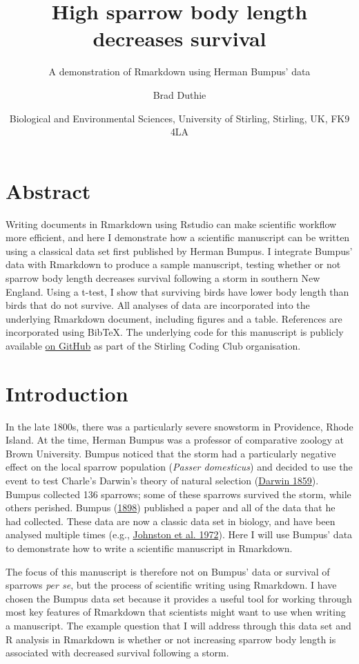 \documentclass[
]{article}
\title{High sparrow body length decreases survival}
\subtitle{A demonstration of Rmarkdown using Herman Bumpus' data}
\author{Brad Duthie}
\date{Biological and Environmental Sciences, University of Stirling,
Stirling, UK, FK9 4LA}
\begin{document}
\maketitle

\hypertarget{abstract}{%
\section{Abstract}\label{abstract}}

Writing documents in Rmarkdown using Rstudio can make scientific
workflow more efficient, and here I demonstrate how a scientific
manuscript can be written using a classical data set first published by
Herman Bumpus. I integrate Bumpus' data with Rmarkdown to produce a
sample manuscript, testing whether or not sparrow body length decreases
survival following a storm in southern New England. Using a t-test, I
show that surviving birds have lower body length than birds that do not
survive. All analyses of data are incorporated into the underlying
Rmarkdown document, including figures and a table. References are
incorporated using BibTeX. The underlying code for this manuscript is
publicly available
\href{https://github.com/StirlingCodingClub/Manuscripts_in_Rmarkdown}{on
GitHub} as part of the Stirling Coding Club organisation.

\hypertarget{introduction}{%
\section{Introduction}\label{introduction}}

In the late 1800s, there was a particularly severe snowstorm in
Providence, Rhode Island. At the time, Herman Bumpus was a professor of
comparative zoology at Brown University. Bumpus noticed that the storm
had a particularly negative effect on the local sparrow population
(\emph{Passer domesticus}) and decided to use the event to test Charle's
Darwin's theory of natural selection
(\protect\hyperlink{ref-Darwin1859}{Darwin 1859}). Bumpus collected 136
sparrows; some of these sparrows survived the storm, while others
perished. Bumpus (\protect\hyperlink{ref-Bumpus1898}{1898}) published a
paper and all of the data that he had collected. These data are now a
classic data set in biology, and have been analysed multiple times
(e.g., \protect\hyperlink{ref-Johnston1972}{Johnston et al. 1972}). Here
I will use Bumpus' data to demonstrate how to write a scientific
manuscript in Rmarkdown.

The focus of this manuscript is therefore not on Bumpus' data or
survival of sparrows \emph{per se}, but the process of scientific
writing using Rmarkdown. I have chosen the Bumpus data set because it
provides a useful tool for working through most key features of
Rmarkdown that scientists might want to use when writing a manuscript.
The example question that I will address through this data set and R
analysis in Rmarkdown is whether or not increasing sparrow body length
is associated with decreased survival following a storm.
\end{document}
